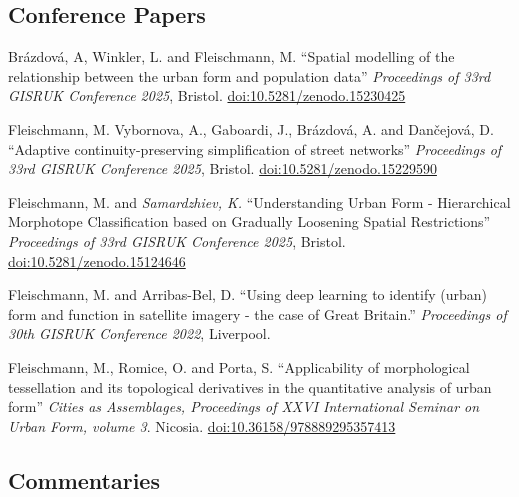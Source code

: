 \documentclass[12pt,a4paper]{report}
\begin{document}
    \subsection*{Conference Papers}

    \begin{tablist}

        \item[2025] \tab{}Brázdová, A, Winkler, L. and Fleischmann, M. \enquote{Spatial modelling of the relationship between the urban form and population data} \textit{Proceedings of 33rd GISRUK Conference 2025}, Bristol. \href{https://doi.org/10.5281/zenodo.15230425}{doi:10.5281/zenodo.15230425}

        \item[2025] \tab{}Fleischmann, M. Vybornova, A., Gaboardi, J., Brázdová, A. and Dančejová, D. \enquote{Adaptive continuity-preserving simplification of street networks} \textit{Proceedings of 33rd GISRUK Conference 2025}, Bristol. \href{https://doi.org/10.5281/zenodo.15229590}{doi:10.5281/zenodo.15229590}

        \item[2025] \tab{}Fleischmann, M. and \textit{Samardzhiev, K.} \enquote{Understanding Urban Form - Hierarchical Morphotope Classification based on Gradually Loosening Spatial Restrictions} \textit{Proceedings of 33rd GISRUK Conference 2025}, Bristol. \href{https://doi.org/10.5281/zenodo.15124646}{doi:10.5281/zenodo.15124646}

        \item[2022] \tab{}Fleischmann, M. and Arribas-Bel, D. \enquote{Using deep learning to identify (urban) form and function in satellite imagery - the case of Great Britain.} \textit{Proceedings of 30th GISRUK Conference 2022}, Liverpool.

        \item[2022] \tab{}Fleischmann, M., Romice, O. and Porta, S. \enquote{Applicability of morphological tessellation and its topological derivatives in the quantitative analysis of urban form} \textit{Cities as Assemblages, Proceedings of XXVI International Seminar on Urban Form, volume 3}. Nicosia. \href{https://doi.org/10.36158/978889295357413}{doi:10.36158/978889295357413}

    \end{tablist}

    \subsection*{Commentaries}
\end{document}
